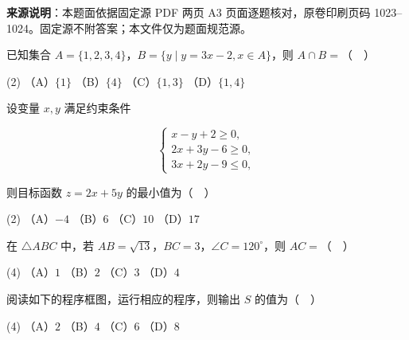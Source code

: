 


\begin{gktip}
\textbf{来源说明}：本题面依据固定源 PDF 两页 A3 页面逐题核对，原卷印刷页码 1023–1024。固定源不附答案；本文件仅为题面规范源。
\end{gktip}


\begin{question}
已知集合 \(A=\{1,2,3,4\}\)，\(B=\{y\mid y=3x-2,x\in A\}\)，则 \(A\cap B=\)（　）

\begin{gkopts}(2)
\task （A）\(\{1\}\)
\task （B）\(\{4\}\)
\task （C）\(\{1,3\}\)
\task （D）\(\{1,4\}\)
\end{gkopts}

\end{question}
\begin{question}
设变量 \(x,y\) 满足约束条件

\nopagebreak[4]
\[
\begin{cases}
x-y+2\geqslant 0,\\
2x+3y-6\geqslant 0,\\
3x+2y-9\leqslant 0,
\end{cases}
\]

则目标函数 \(z=2x+5y\) 的最小值为（　）

\begin{gkopts}(2)
\task （A）\(-4\)
\task （B）\(6\)
\task （C）\(10\)
\task （D）\(17\)
\end{gkopts}

\end{question}
\begin{question}
在 \(\triangle ABC\) 中，若 \(AB=\sqrt{13}\)，\(BC=3\)，\(\angle C=120^{\circ}\)，则 \(AC=\)（　）

\begin{gkopts}(4)
\task （A）\(1\)
\task （B）\(2\)
\task （C）\(3\)
\task （D）\(4\)
\end{gkopts}

\Needspace{0.48\textheight}

\Needspace{0.4\textheight}
\end{question}
\begin{question}
阅读如下的程序框图，运行相应的程序，则输出 \(S\) 的值为（　）
\nopagebreak[4]
\begin{center}\end{center}
\nopagebreak[4]
\begin{gkopts}(4)
\task （A）\(2\)
\task （B）\(4\)
\task （C）\(6\)
\task （D）\(8\)
\end{gkopts}

\end{question}
